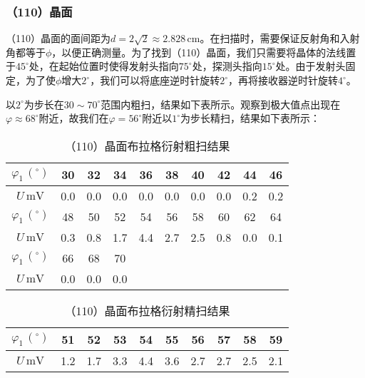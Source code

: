 \documentclass[12pt]{article}
\begin{document}
\subsubsection{（110）晶面}
（110）晶面的面间距为$d=2\sqrt{2}\approx2.828\,\mathrm{cm}$。在扫描时，需要保证反射角和入射角都等于$\phi$，以便正确测量。为了找到（110）晶面，我们只需要将晶体的法线置于$45^\circ$处，在起始位置时使得发射头指向$75^\circ$处，探测头指向$15^\circ$处。由于发射头固定，为了使$\phi$增大$2^\circ$，我们可以将底座逆时针旋转$2^\circ$，再将接收器逆时针旋转$4^\circ$。

以$2^\circ$为步长在$30\sim70^\circ$范围内粗扫，结果如下表所示。观察到极大值点出现在$\varphi\approx68^\circ$附近，故我们在$\varphi=56^\circ$附近以$1^\circ$为步长精扫，结果如下表所示：

\newpage

\begin{table}[h!]
    \centering
    \begin{tabular}{|c|c|c|c|c|c|c|c|c|c|}
    \hline
    $\varphi_1\,(^\circ)$ & 30  & 32  & 34  & 36  & 38  & 40  & 42  & 44  & 46  \\ \hline
    $U\,\mathrm{mV}$   & 0.0 & 0.0 & 0.0 & 0.0 & 0.0 & 0.0 & 0.0 & 0.2 & 0.2 \\ \hline
    $\varphi_1\,(^\circ)$ & 48  & 50  & 52  & 54  & 56  & 58  & 60  & 62  & 64  \\ \hline
    $U\,\mathrm{mV}$   & 0.3 & 0.8 & 1.7 & 4.4 & 2.7 & 2.5 & 0.8 & 0.0 & 0.1 \\ \hline
    $\varphi_1\,(^\circ)$ & 66  & 68  & 70  &     &     &     &     &     &     \\ \hline
    $U\,\mathrm{mV}$   & 0.0 & 0.0 & 0.0 &     &     &     &     &     &     \\ \hline
    \end{tabular}
    \caption{（110）晶面布拉格衍射粗扫结果}
\end{table}

\begin{table}[h!]
    \centering
    \begin{tabular}{|c|c|c|c|c|c|c|c|c|c|}
        \hline
        $\varphi_1\,(^\circ)$ & 51 & 52 & 53 & 54 & 55 & 56 & 57 & 58 & 59 \\
        \hline
        $U\,\mathrm{mV}$ & 1.2 & 1.7 & 3.3 & 4.4 & 3.6 & 2.7 & 2.7 & 2.5 & 2.1 \\
        \hline
    \end{tabular}
    \caption{（110）晶面布拉格衍射精扫结果}
\end{table}
\end{document}
